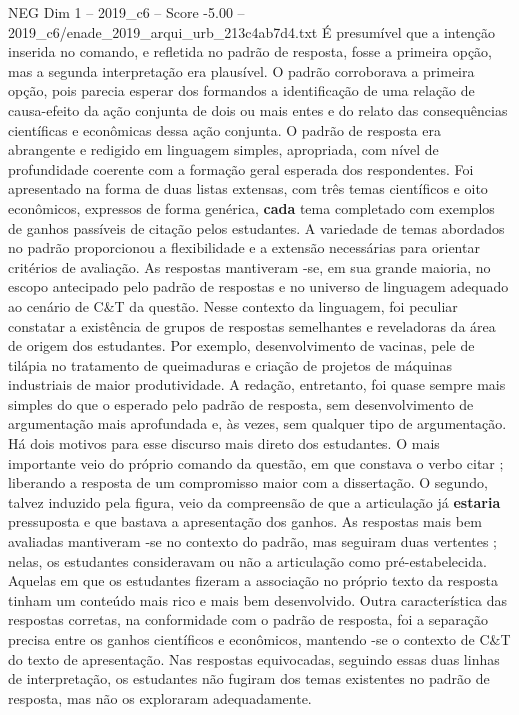 \begin{textsample}{NEG Dim 1 – 2019\_c6 – Score -5.00 – 2019\_c6/enade\_2019\_arqui\_urb\_213c4ab7d4.txt}
É presumível que a intenção inserida no comando, e refletida no padrão de resposta, fosse a primeira opção, mas a segunda interpretação era plausível.
O padrão corroborava a primeira opção, pois parecia esperar dos formandos a identificação de uma relação de causa-efeito da ação conjunta de dois ou mais entes e do relato das consequências científicas e econômicas dessa ação conjunta.
O padrão de resposta era abrangente e redigido em linguagem simples, apropriada, com nível de profundidade coerente com a formação geral esperada dos respondentes.
Foi apresentado na forma de duas listas extensas, com três temas científicos e oito econômicos, expressos de forma genérica, \textbf{cada} tema completado com exemplos de ganhos passíveis de citação pelos estudantes.
A variedade de temas abordados no padrão proporcionou a flexibilidade e a extensão necessárias para orientar critérios de avaliação.
As respostas mantiveram -se, em sua grande maioria, no escopo antecipado pelo padrão de respostas e no universo de linguagem adequado ao cenário de C\&T da questão.
Nesse contexto da linguagem, foi peculiar constatar a existência de grupos de respostas semelhantes e reveladoras da área de origem dos estudantes.
Por exemplo, desenvolvimento de vacinas, pele de tilápia no tratamento de queimaduras e criação de projetos de máquinas industriais de maior produtividade.
A redação, entretanto, foi quase sempre mais simples do que o esperado pelo padrão de resposta, sem desenvolvimento de argumentação mais aprofundada e, às vezes, sem qualquer tipo de argumentação.
Há dois motivos para esse discurso mais direto dos estudantes.
O mais importante veio do próprio comando da questão, em que constava o verbo citar ; liberando a resposta de um compromisso maior com a dissertação.
O segundo, talvez induzido pela figura, veio da compreensão de que a articulação já \textbf{estaria} pressuposta e que bastava a apresentação dos ganhos.
As respostas mais bem avaliadas mantiveram -se no contexto do padrão, mas seguiram duas vertentes ; nelas, os estudantes consideravam ou não a articulação como pré-estabelecida.
Aquelas em que os estudantes fizeram a associação no próprio texto da resposta tinham um conteúdo mais rico e mais bem desenvolvido.
Outra característica das respostas corretas, na conformidade com o padrão de resposta, foi a separação precisa entre os ganhos científicos e econômicos, mantendo -se o contexto de C\&T do texto de apresentação.
Nas respostas equivocadas, seguindo essas duas linhas de interpretação, os estudantes não fugiram dos temas existentes no padrão de resposta, mas não os exploraram adequadamente.

\end{textsample}
